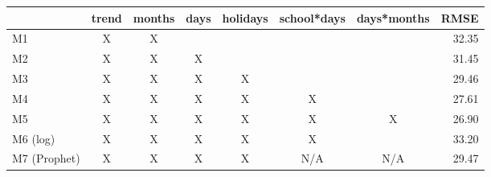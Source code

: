 \begin{tabular}{lccccccr}
\toprule
      & trend & months & days   & holidays & school*days & \multicolumn{1}{l}{days*months} & \multicolumn{1}{l}{RMSE} \\
\midrule
M1    & X     & X     &       &       &       &       & 32.35 \\
M2    & X     & X     & X     &       &       &       & 31.45 \\
M3    & X     & X     & X     & X     &       &       & 29.46 \\
M4    & X     & X     & X     & X     & X     &       & 27.61 \\
M5    & X     & X     & X     & X     & X     &      X & 26.90 \\
M6 (log) & X     & X     & X     & X     & X     &       & 33.20 \\
M7 (Prophet) & X     & X     & X     & X     & N/A     &  N/A     & 29.47 \\
\bottomrule
\end{tabular}%

